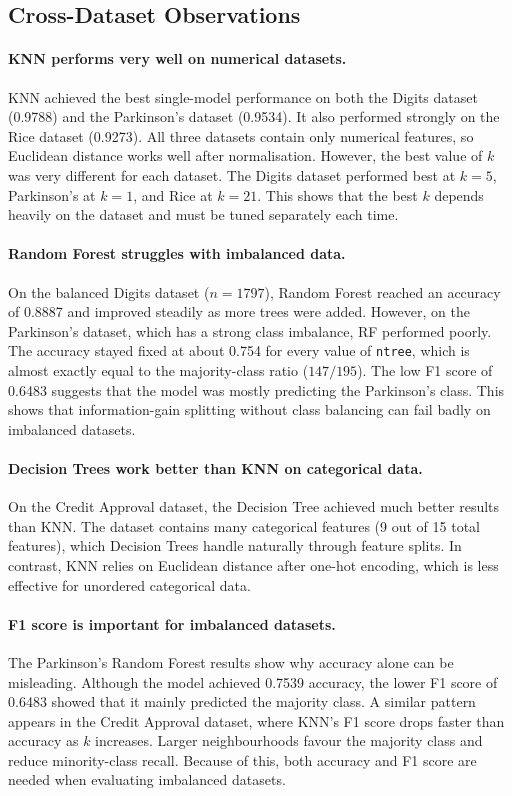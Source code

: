 \documentclass[11pt,letterpaper]{article}
\begin{document}
\subsection{Cross-Dataset Observations}

\paragraph{KNN performs very well on numerical datasets.}
KNN achieved the best single-model performance on both the Digits dataset
(0.9788) and the Parkinson’s dataset (0.9534). It also performed strongly
on the Rice dataset (0.9273). All three datasets contain only numerical
features, so Euclidean distance works well after normalisation. However,
the best value of $k$ was very different for each dataset. The Digits
dataset performed best at $k=5$, Parkinson’s at $k=1$, and Rice at
$k=21$. This shows that the best $k$ depends heavily on the dataset and
must be tuned separately each time.

\paragraph{Random Forest struggles with imbalanced data.}
On the balanced Digits dataset ($n=1797$), Random Forest reached an
accuracy of 0.8887 and improved steadily as more trees were added.
However, on the Parkinson’s dataset, which has a strong class imbalance,
RF performed poorly. The accuracy stayed fixed at about 0.754 for every
value of \texttt{ntree}, which is almost exactly equal to the majority-class
ratio ($147/195$). The low F1 score of 0.6483 suggests that the model was
mostly predicting the Parkinson’s class. This shows that information-gain
splitting without class balancing can fail badly on imbalanced datasets.

\paragraph{Decision Trees work better than KNN on categorical data.}
On the Credit Approval dataset, the Decision Tree achieved much better
results than KNN. The dataset contains many categorical features
(9 out of 15 total features), which Decision Trees handle naturally through
feature splits. In contrast, KNN relies on Euclidean distance after one-hot
encoding, which is less effective for unordered categorical data.

\paragraph{F1 score is important for imbalanced datasets.}
The Parkinson’s Random Forest results show why accuracy alone can be
misleading. Although the model achieved 0.7539 accuracy, the lower
F1 score of 0.6483 showed that it mainly predicted the majority class.
A similar pattern appears in the Credit Approval dataset, where KNN’s
F1 score drops faster than accuracy as $k$ increases. Larger neighbourhoods
favour the majority class and reduce minority-class recall. Because of this,
both accuracy and F1 score are needed when evaluating imbalanced datasets.
\end{document}

